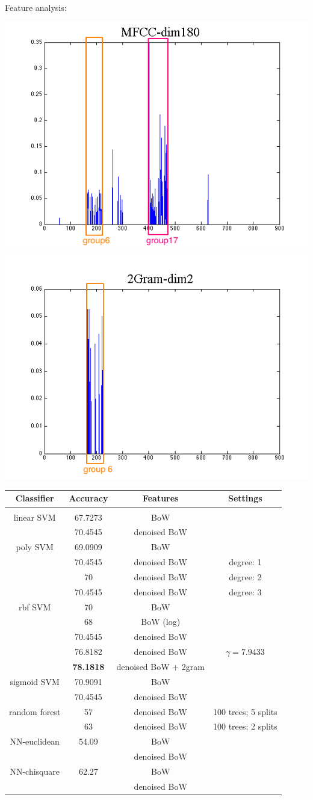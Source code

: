 
Feature analysis:

\includegraphics[width=0.18 \linewidth]{./images/mfcc_180.png}
\includegraphics[width=0.19 \linewidth]{./images/ngram_202.png}

\footnotesize
\begin{tabular}{cccc}
\multicolumn{1}{c}{\bf Classifier }&\multicolumn{1}{c}{\bf Accuracy}  &\multicolumn{1}{c}{\bf Features} &\multicolumn{1}{c}{\bf Settings}
\\ \hline \\
linear SVM		&67.7273 		&BoW 		&  \\
			& 70.4545  	& denoised BoW 	&  \\
poly SVM		&69.0909		&BoW 		&  \\
			& 70.4545  	& denoised BoW 	& degree: 1  \\
			& 70 			& denoised BoW 	& degree: 2  \\
			& 70.4545  	& denoised BoW 	& degree: 3  \\
rbf SVM       	&70 			&BoW 		&  \\
                     	&68  			&  BoW (log) 	&  \\
          		&70.4545  		&  denoised BoW 	&  \\
          		&76.8182  		&  denoised BoW 	&  $\gamma = 7.9433$ \\
          		&{\bf 78.1818}  	&  denoised BoW + 2gram 	&    \\
sigmoid SVM     	&70.9091		&BoW 		&  \\
       			&70.4545  		& denoised BoW 	&  \\
random forest    	&57			& denoised BoW	& 100 trees; 5 splits \\
       			&63  			& denoised BoW 	& 100 trees; 2 splits \\
NN-euclidean   	&54.09		& BoW	&  \\
       			&			& denoised BoW 	&  \\
NN-chisquare	&62.27		& BoW	&  \\
       			&			& denoised BoW 	& \\

\end{tabular}


